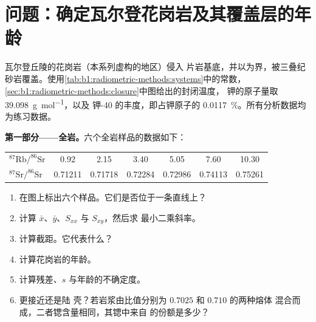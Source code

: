 \section{问题：确定瓦尔登花岗岩及其覆盖层的年龄}

\begin{problem}
\label{pb:b1:radiometric-methods:1}
瓦尔登丘陵的花岗岩（本系列虚构的地区）侵入
片岩基底，并以为界，被三叠纪
砂岩覆盖。使用\cref{tab:b1:radiometric-methods:systems}中的常数，
\cref{sec:b1:radiometric-methods:closure}中图给出的封闭温度，
钾的原子量取 \qty{39.098}{g.mol^{-1}}，以及
钾-40 的丰度，即占钾原子的 \qty{0.0117}{\percent}。所有分析数据均
为练习数据。

\medskip
\noindent\textbf{第一部分——全岩。}六个全岩样品的数据如下：
\begin{center}
\small
\begin{tabular}{|l|cccccc|}
\hline
$^{87}\mathrm{Rb}/^{86}\mathrm{Sr}$ & 0.92 & 2.15 & 3.40 & 5.05 & 7.60 & 10.30 \\
$^{87}\mathrm{Sr}/^{86}\mathrm{Sr}$ & 0.71211 & 0.71718 & 0.72284 & 0.72986 & 0.74113 & 0.75261 \\
\hline
\end{tabular}
\end{center}
\begin{enumerate}
  \item 在图上标出六个样品。它们是否位于一条直线上？
  \item 计算 $\bar x$、$\bar y$、$S_{xx}$ 与 $S_{xy}$，然后求
        最小二乘斜率。
  \item 计算截距。它代表什么？
  \item 计算花岗岩的年龄。
  \item 计算残差、$s$ 与年龄的不确定度。
  \item {}更接近还是陆
        壳？若岩浆由比值分别为 $0.7025$ 和 $0.710$ 的两种熔体
        混合而成，二者锶含量相同，其锶中来自
        的份额是多少？
\end{enumerate}


\end{problem}
